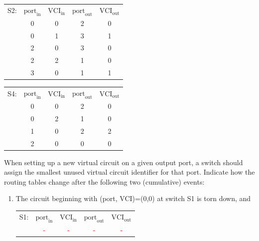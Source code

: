 \documentclass[10pt, a4paper]{article}
\begin{document}
\begin{enumerate}
\begin{enumerate}
\begin{center}
            \begin{tabular}{|c|c|c|c|c|}
                \hline
                S2: & $\mbox{port}_{\mbox{in}}$ & $\mbox{VCI}_{\mbox{in}}$ & $\mbox{port}_{\mbox{out}}$ & $\mbox{VCI}_{\mbox{out}}$\\
                \cline {2-5}
                & 0 & 0 & 2 & 0\\
                \cline {2-5}
                & 0 & 1 & 3 & 1\\
                \cline {2-5}
                & 2 & 0 & 3 & 0\\
                \cline {2-5}
                & 2 & 2 & 1 & 0\\
                \cline {2-5}
                & 3 & 0 & 1 & 1\\
                \hline
            \end{tabular}\qquad
            \begin{tabular}{|c|c|c|c|c|}
                \hline
                S4: & $\mbox{port}_{\mbox{in}}$ & $\mbox{VCI}_{\mbox{in}}$ & $\mbox{port}_{\mbox{out}}$ & $\mbox{VCI}_{\mbox{out}}$\\
                \cline {2-5}
                & 0 & 0 & 2 & 0\\
                \cline {2-5}
                & 0 & 2 & 1 & 0\\
                \cline {2-5}
                & 1 & 0 & 2 & 2\\
                \cline {2-5}
                & 2 & 0 & 0 & 0\\
                \hline
            \end{tabular}
        \end{center}
        When setting up a new virtual circuit on a given output port, a switch should assign the smallest unused virtual circuit identifier for that port. Indicate how the routing tables change after the following two (cumulative) events:
        \begin{enumerate}
        \item The circuit beginning with (port, VCI)=(0,0) at switch S1 is torn down, and\\
            \color{blue}
            \begin{tabular}{|c|c|c|c|c|}
                \hline
                S1: & $\mbox{port}_{\mbox{in}}$ & $\mbox{VCI}_{\mbox{in}}$ & $\mbox{port}_{\mbox{out}}$ & $\mbox{VCI}_{\mbox{out}}$\\
                \cline {2-5}
                & \textcolor{red}{-} & \textcolor{red}{-} & \textcolor{red}{-} & \textcolor{red}{-}\\

\end{tabular}
\end{enumerate}
\end{enumerate}
\end{enumerate}
\end{document}
